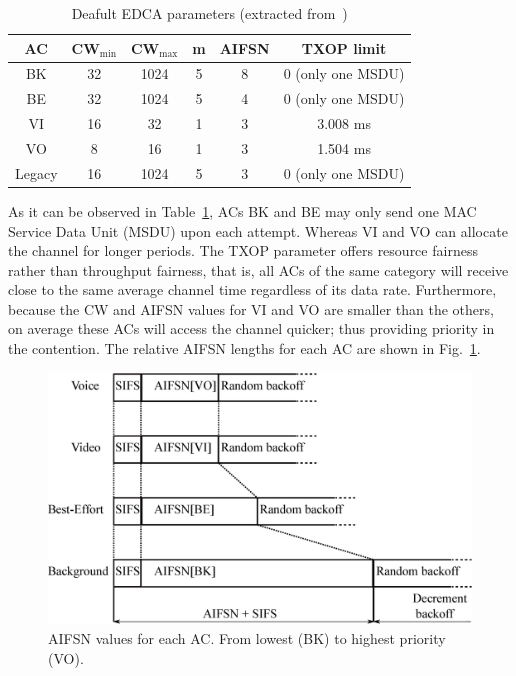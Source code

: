 	\begin{table}[t]
		\centering
		\caption{Deafult EDCA parameters (extracted from~\cite{perahia2013next})}
		\label{tab:EDCAparams}
		\begin{tabular}{|c|c|c|c|c|c|}
			\hline
			{\bfseries AC} & {\bfseries CW$_{\min}$} & {\bfseries CW$_{\max}$} &		{\bfseries m}		& {\bfseries AIFSN} & {\bfseries TXOP limit}\\
			\hline
			BK 		       & 		32			&		1024		   &			5			& 		8		  &		0 (only one MSDU)\\
			BE 		       & 		32			&		1024		   &			5			& 		4		  &		0 (only one MSDU)	\\
			VI 		       & 		16			&		32		  	   &			1			& 		3		  &		3.008 ms		\\
			VO 		       & 		8			&		16		  	   &			1			& 		3		  &		1.504 ms		\\
			Legacy	       & 		16			&		1024	  	   &			5			& 		3		  &		0 (only one MSDU)\\
			\hline
		\end{tabular}
	\end{table}

As it can be observed in Table~\ref{tab:EDCAparams}, ACs BK and BE may only send one MAC Service Data Unit (MSDU) upon each attempt. Whereas VI and VO can allocate the channel for longer periods. The TXOP parameter offers resource fairness rather than throughput fairness, that is, all ACs of the same category will receive close to the same average channel time regardless of its data rate. Furthermore, because the CW and AIFSN values for VI and VO are smaller than the others, on average these ACs will access the channel quicker; thus providing priority in the contention. The relative AIFSN lengths for each AC are shown in Fig.~\ref{fig:AIFSN}.

	\begin{figure}[t]
	\centering
		\includegraphics[width=\linewidth]{figures/AIFSN.eps}
		\caption{AIFSN values for each AC. From lowest (BK) to highest priority (VO).}
		\label{fig:AIFSN}
	\end{figure}

